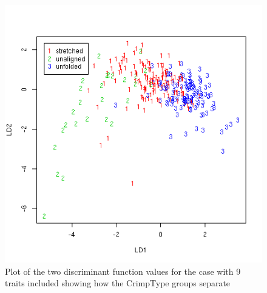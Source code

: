 %

\begin{figure}[!h]
  \centering
  \includegraphics[width=1.1\textwidth]{figlda2.png}
  \caption{Plot of the two discriminant function values for the case with 9 traits included showing how the CrimpType groups separate}
  \label{fig:lda2}
\end{figure}

%

